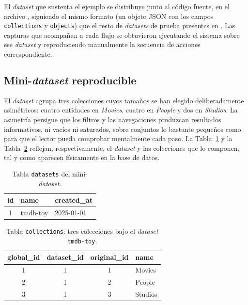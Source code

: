 El \textit{dataset} que sustenta el ejemplo se distribuye junto al código fuente,
en el archivo , siguiendo el
mismo formato (un objeto JSON con los campos \texttt{collections} y
\texttt{objects}) que el resto de \textit{datasets} de prueba presentes
en . Las capturas que acompañan a cada flujo se
obtuvieron ejecutando el sistema sobre ese \textit{dataset} y reproduciendo
manualmente la secuencia de acciones correspondiente.

\subsection{Mini-\textit{dataset} reproducible}
\label{subsec:ejemplo_dataset}

El \textit{dataset} agrupa tres colecciones cuyos tamaños se han elegido
deliberadamente asimétricos: cuatro entidades en \textit{Movies}, cuatro
en \textit{People} y dos en \textit{Studios}. La asimetría persigue que
los filtros y las navegaciones produzcan resultados informativos, ni
vacíos ni saturados, sobre conjuntos lo bastante pequeños como para que
el lector pueda comprobar mentalmente cada paso. La
Tabla~\ref{tab:ejemplo_datasets} y la Tabla~\ref{tab:ejemplo_collections}
reflejan, respectivamente, el \textit{dataset} y las colecciones que lo
componen, tal y como aparecen físicamente en la base de datos.

\begin{table}[h]
  \centering
  \begin{tabular}{|c|l|l|}
    \hline
    \textbf{id} & \textbf{name} & \textbf{created\_at} \\ \hline
    1 & tmdb-toy & 2025-01-01 \\ \hline
  \end{tabular}
  \caption{Tabla \texttt{datasets} del mini-\textit{dataset}.}
  \label{tab:ejemplo_datasets}
\end{table}

\begin{table}[h]
  \centering
  \begin{tabular}{|c|c|c|l|}
    \hline
    \textbf{global\_id} & \textbf{dataset\_id} & \textbf{original\_id} & \textbf{name} \\ \hline
    1 & 1 & 1 & Movies  \\ \hline
    2 & 1 & 2 & People  \\ \hline
    3 & 1 & 3 & Studios \\ \hline
  \end{tabular}
  \caption[Tabla \texttt{collections} del mini-\textit{dataset}]{Tabla \texttt{collections}: tres colecciones bajo el \textit{dataset} \texttt{tmdb-toy}.}
  \label{tab:ejemplo_collections}
\end{table}

